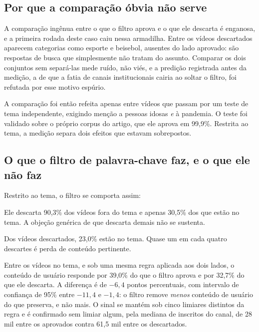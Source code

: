 \subsection{Por que a comparação óbvia não serve}

A comparação ingênua entre o que o filtro aprova e o que ele descarta é enganosa, e
a primeira rodada deste caso caiu nessa armadilha. Entre os vídeos descartados
aparecem categorias como esporte e beisebol, ausentes do lado aprovado: são
respostas de busca que simplesmente não tratam do assunto. Comparar os dois conjuntos
sem separá-las mede ruído, não viés, e a predição registrada antes da medição, a de
que a fatia de canais institucionais cairia ao soltar o filtro, foi refutada por esse
motivo espúrio.

A comparação foi então refeita apenas entre vídeos que passam por um teste de tema
independente, exigindo menção a pessoas idosas \emph{e} à pandemia. O teste foi
validado sobre o próprio corpus do artigo, que ele aprova em 99,9\%. Restrita ao
tema, a medição separa dois efeitos que estavam sobrepostos.

\subsection{O que o filtro de palavra-chave faz, e o que ele não faz}

Restrito ao tema, o filtro se comporta assim:

\begin{description}[leftmargin=1.5em,style=nextline]
  \item[O filtro é, em boa medida, limpeza legítima.] Ele descarta 90,3\% dos vídeos
  fora do tema e apenas 30,5\% dos que estão no tema. A objeção genérica de que
  descarta demais não se sustenta.
  \item[Mas o resíduo é substantivo.] Dos vídeos descartados, 23,0\% estão no tema.
  Quase um em cada quatro descartes é perda de conteúdo pertinente.
  \item[E o descarte não é enviesado na direção prevista.] Entre os vídeos no tema, e
  sob uma mesma regra aplicada aos dois lados, o conteúdo de usuário responde por
  39,0\% do que o filtro aprova e por 32,7\% do que ele descarta. A diferença é de
  $-6{,}4$ pontos percentuais, com intervalo de confiança de 95\% entre $-11{,}4$ e
  $-1{,}4$: o filtro remove \emph{menos} conteúdo de usuário do que preserva, e não
  mais. O sinal se mantém sob cinco limiares distintos da regra e é confirmado sem
  limiar algum, pela mediana de inscritos do canal, de 28 mil entre os aprovados
  contra 61,5 mil entre os descartados.
\end{description}

